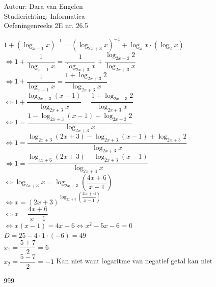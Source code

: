\documentclass[a4paper]{article}
\begin{document}
  
\noindent \large Auteur: Dara van Engelen\\
\noindent \large Studierichting: Informatica\\
\noindent \large Oefeningenreeks 2E nr. 26.5\\

\medskip

\normalsize

$1 + \left(\log _{x-1} x\right)^{-1} = \left(\log _{2x+3} x\right)^{-1} + \log _x x \cdot \left(\log _2 x \right) $\\

$\Leftrightarrow 1 + \dfrac{1}{\log _{x-1} x}  = \dfrac{1}{\log _{2x+3} x} + \dfrac{\log _{2x+3} 2}{\log _{2x+3} x}$\\

$\Leftrightarrow 1 + \dfrac{1}{\log _{x-1} x} = \dfrac{1 + \log _{2x+3} 2 }{\log _{2x+3} x}$\\

$\Leftrightarrow 1 + \dfrac{\log _{2x+3} (x-1)}{\log _{2x+3} x} = \dfrac{1 + \log _{2x+3} 2 }{\log _{2x+3} x}$\\

$\Leftrightarrow 1 = \dfrac{1 - \log _{2x+3} (x-1) + \log _{2x+3} 2}{\log _{2x+3} x}$\\

$\Leftrightarrow 1 = \dfrac{\log _{2x+3} (2x+3) - \log _{2x+3} (x-1) + \log _{2x+3} 2}{\log _{2x+3} x} $\\

$\Leftrightarrow 1 = \dfrac{\log _{4x+6} (2x+3) - \log _{2x+3} (x-1)}{\log _{2x+3} x}$\\

$\Leftrightarrow \log _{2x+3} x = \log _{2x+3} \left(\dfrac{4x+6}{x-1}\right)$\\

$\Leftrightarrow x = \left(2x+3\right)^{\log _{2x+3} \left(\dfrac{4x+6}{x-1}\right)}$\\

$\Leftrightarrow x = \dfrac{4x+6}{x-1}$\\

$\Leftrightarrow x(x-1) = 4x+6 \Leftrightarrow x^2 -5x -6 = 0$\\

$D = 25 - 4\cdot1\cdot(-6) = 49$\\

$x_1 = \dfrac{5+7}{2} = 6$\\

$x_2 = \dfrac{5-7}{2} = -1$ Kan niet want logaritme van negatief getal kan niet\\

\begin{thebibliography}{999}
\end{thebibliography}
\end{document}

